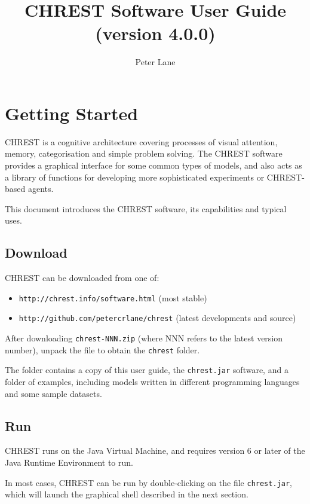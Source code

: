 \documentclass{article}
\title{CHREST Software User Guide \\ (version 4.0.0)}
\author{Peter Lane}
\begin{document}
\maketitle
\tableofcontents

\newpage
\section{Getting Started}

CHREST is a cognitive architecture covering processes of visual attention,
memory, categorisation and simple problem solving.  The CHREST software
provides a graphical interface for some common types of models, and also acts
as a library of functions for developing more sophisticated experiments or
CHREST-based agents.

This document introduces the CHREST software, its capabilities and typical 
uses. 

\subsection{Download}

CHREST can be downloaded from one of:

\begin{itemize}
\item {\tt http://chrest.info/software.html}  (most stable)
\item {\tt http://github.com/petercrlane/chrest} (latest developments and source)
\end{itemize}

\noindent After downloading {\tt chrest-NNN.zip} (where NNN refers to the
latest version number), unpack the file to obtain the {\tt chrest} folder.

The folder contains a copy of this user guide, the {\tt chrest.jar} software, 
and a folder of examples, including models written in different programming 
languages and some sample datasets.

\subsection{Run}

CHREST runs on the Java Virtual Machine, and requires version 6 or later of the 
Java Runtime Environment to run.

In most cases, CHREST can be run by double-clicking on the file {\tt chrest.jar}, 
which will launch the graphical shell described in the next section.
\end{document}
